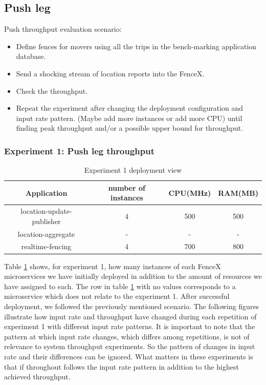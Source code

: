 \documentclass[a4]{report}
\begin{document}
    \subsection{Push leg}
    Push throughput evaluation scenario:
    \begin{itemize}
        \item[1-] Define fences for movers using all the trips in the bench-marking application database.
        \item[2-] Send a shocking stream of location reports into the FenceX.
        \item[3-] Check the throughput.
        \item[4-] Repeat the experiment after changing the deployment configuration and input rate pattern. (Maybe add
        more instances or add more CPU) until finding peak throughput and/or a possible upper bound for throughput.
    \end{itemize}

    \subsubsection{Experiment 1: Push leg throughput}
    \begin{table}[h!]
        \centering
        \begin{tabular}{|c|c|c|c|}
            \hline
            Application               & number of instances & CPU(MHz) & RAM(MB) \\
            \hline
            location-update-publisher & 4                   & 500      & 500     \\
            location-aggregate        & -                   & -        & -       \\
            realtime-fencing          & 4                   & 700      & 800     \\
            \hline
        \end{tabular}
        \caption{Experiment 1 deployment view}
        \label{table:ex1-dv}
    \end{table}

    Table \ref{table:ex1-dv} shows, for experiment 1, how many instances of each FenceX microservices we have initially
    deployed in addition to the amount of resources we have assigned to each.
    The row in table \ref{table:ex1-dv} with no values corresponds to a microservice which does not relate to the
    experiment 1.
    After successful deployment, we followed the previously mentioned scenario.
    The following figures illustrate how input rate and throughput have changed during each repetition of experiment 1
    with different input rate patterns.
    It is important to note that the pattern at which input rate changes, which differs among repetitions, is not of
    relevance to system throughput experiments.
    So the pattern of changes in input rate and their differences can be ignored.
    What matters in these experiments is that if throughout follows the input rate pattern in addition to the highest
    achieved throughput.
\end{document}
